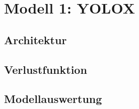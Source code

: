 \chapter{Modell 1: YOLOX}\label{chap:yolox}
\section{Architektur}



\section{Verlustfunktion}



\section{Modellauswertung}